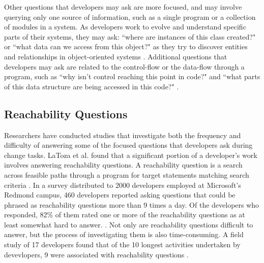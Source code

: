 \par Other questions that developers may ask are more focused, and may involve
querying only one source of information, such as a single program or a
collection of modules in a system.
As developers work to evolve and understand specific parts of their systems,
they may ask: ``where are instances of this class created?" or
``what data can we access from this object?" as they try to discover entities
and relationships in object-oriented systems
\cite{sillito-2006-questions-during-task}.
Additional questions that developers may ask are related to 
the control-flow or the data-flow through a program, such as 
``why isn't control reaching this point in code?" and 
``what parts of this data structure are being accessed in this code?" 
\cite{sillito-2006-questions-during-task}.

\subsection{Reachability Questions}
\label{subsec:ReachabilityQuestions}

\par Researchers have conducted studies that investigate both the 
frequency and difficulty of answering some of the focused questions that 
developers ask during change tasks.
LaToza et al. found that a significant portion of a developer's work involves 
answering reachability questions.
A reachability question is a search across feasible paths through a program for 
target statements matching search criteria \cite{latoza-2010-reach}.
In a survey distributed to 2000 developers employed at Microsoft's Redmond
campus, 460 developers reported asking questions that could be phrased as 
reachability questions more than 9 times a day.
Of the developers who responded, 82\% of them rated one or more of the
reachability questions as at least somewhat hard to answer.
\cite{latoza-2010-reach}.
Not only are reachability questions difficult to answer, but the process of
investigating them is also time-consuming.
A field study of 17 developers found that of the 10 longest activities
undertaken by devevlopers, 9 were associated with reachability questions
\cite{latoza-2010-reach}.

